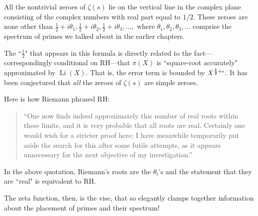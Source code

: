 \documentclass[openany]{book}
\DeclareMathOperator{\Li}{Li}
\theoremstyle{plain}
\theoremstyle{definition}
\begin{document}
{{\begin{center}
{\begin{minipage}{0.9\textwidth}
       All the nontrivial zeroes of $\zeta(s)$ lie on the vertical
       line in the complex plane consisting of the
       complex numbers with real part equal to $1/2$.
       These zeroes are none other than
       ${\frac{1}{2}}+i\theta_1,{\frac{1}{2}}+i\theta_2,
       {\frac{1}{2}}+i\theta_3,\dots,$ where $\theta_1, \theta_2,
       \theta_3, \dots$ comprise the spectrum of primes we talked
       about in the earlier chapters.

\vspace{1ex}
\end{minipage}}
      \end{center}

The ``${\frac{1}{2}}$" that appears in this formula is directly related to the fact---correspondingly conditional on RH---that $\pi(X)$ is ``square-root accurately" approximated by $\Li(X)$.  That is, the error term is bounded by $X^{{\bf{\frac{1}{2}}}+\epsilon}.$  It has been conjectured that {\it all} the zeroes of $\zeta(s)$ are simple zeroes.


Here is how Riemann phrased RH:

 \begin{quote}
  ``One now finds indeed approximately this number of real roots
  within these limits, and it is very probable that all roots are
  real. Certainly one would wish for a stricter proof here; I have
  meanwhile temporarily put aside the search for this after some
  futile attempts, as it appears unnecessary for the next objective of
  my investigation.''
\end{quote}

 In the above quotation, Riemann's roots are the $\theta_i$'s and the statement that they are ``real" is equivalent to RH.

      The zeta function, then, is the vise, that so elegantly clamps
      together information about the placement of primes and their
      spectrum!


}}
\end{document}
